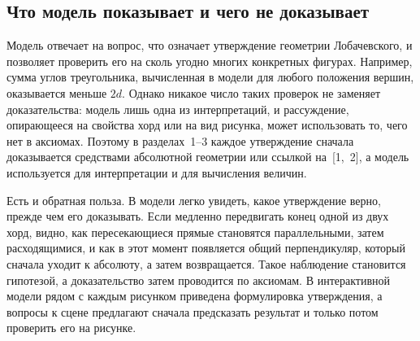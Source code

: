 \subsection{Что модель показывает и чего не доказывает}

Модель отвечает на вопрос, что означает утверждение геометрии Лобачевского, и позволяет проверить его на сколь угодно многих конкретных фигурах. Например, сумма углов треугольника, вычисленная в модели для любого положения вершин, оказывается меньше $2d$. Однако никакое число таких проверок не заменяет доказательства: модель лишь одна из интерпретаций, и рассуждение, опирающееся на свойства хорд или на вид рисунка, может использовать то, чего нет в аксиомах. Поэтому в разделах~1--3 каждое утверждение сначала доказывается средствами абсолютной геометрии или ссылкой на~[1,~2], а модель используется для интерпретации и для вычисления величин.

Есть и обратная польза. В модели легко увидеть, какое утверждение верно, прежде чем его доказывать. Если медленно передвигать конец одной из двух хорд, видно, как пересекающиеся прямые становятся параллельными, затем расходящимися, и как в этот момент появляется общий перпендикуляр, который сначала уходит к абсолюту, а затем возвращается. Такое наблюдение становится гипотезой, а доказательство затем проводится по аксиомам. В интерактивной модели рядом с каждым рисунком приведена формулировка утверждения, а вопросы к сцене предлагают сначала предсказать результат и только потом проверить его на рисунке.
